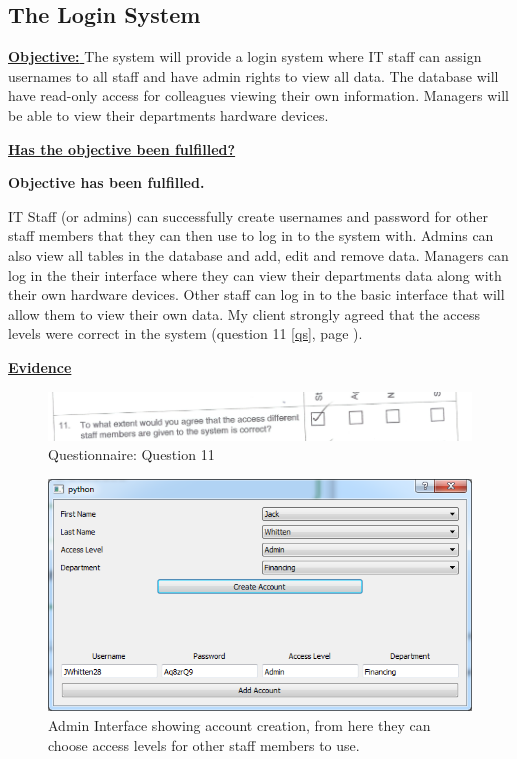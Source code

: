 \subsection{The Login System}

\underline{\textbf{Objective:} } The system will provide a login system where IT staff can assign usernames to all staff and have admin rights to view all data. The database will have read-only access for colleagues viewing their own information. Managers will be able to view their departments hardware devices.

\underline{\textbf{Has the objective been fulfilled?}}

\textbf{Objective has been fulfilled.}

IT Staff (or admins) can successfully create usernames and password for other staff members that they can then use to log in to the system with. Admins can also view all tables in the database and add, edit and remove data. Managers can log in the their interface where they can view their departments data along with their own hardware devices. Other staff can log in to the basic interface that will allow them to view their own data. My client strongly agreed that the access levels were correct in the system (question 11 \ref{qs}, page \pageref{qs}).

\underline{\textbf{Evidence}}

\begin{figure}[H]
    \includegraphics[width=\textwidth]{./Evaluation/EvaluationQuestionnaire/11.png}
    \caption{Questionnaire: Question 11} 
\end{figure}


\begin{figure}[H]
    \includegraphics[width=\textwidth]{./Evaluation/Images/login1.png}
    \caption{Admin Interface showing account creation, from here they can choose access levels for other staff members to use.} 
\end{figure}

